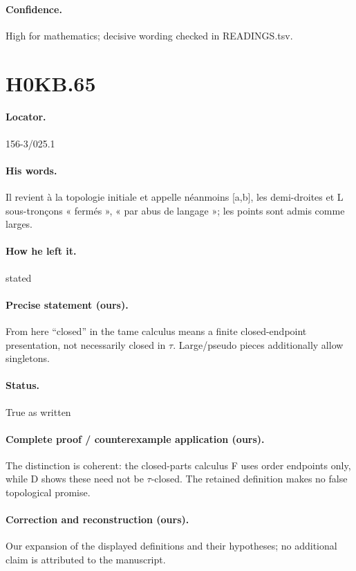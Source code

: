 \paragraph{Confidence.} High for mathematics; decisive wording checked in READINGS.tsv.

\section*{H0KB.65}\label{statement:H0KB.65}
\paragraph{Locator.} 156-3/025.1

\paragraph{His words.} Il revient à la topologie initiale et appelle néanmoins [a,b], les demi-droites et L sous-tronçons « fermés », « par abus de langage »; les points sont admis comme larges.

\paragraph{How he left it.} stated

\paragraph{Precise statement (ours).} From here “closed” in the tame calculus means a finite closed-endpoint presentation, not necessarily closed in \ensuremath{\tau}. Large/pseudo pieces additionally allow singletons.

\paragraph{Status.} True as written

\paragraph{Complete proof / counterexample application (ours).} The distinction is coherent: the closed-parts calculus F uses order endpoints only, while D shows these need not be \ensuremath{\tau}-closed. The retained definition makes no false topological promise.

\paragraph{Correction and reconstruction (ours).} Our expansion of the displayed definitions and their hypotheses; no additional claim is attributed to the manuscript.

